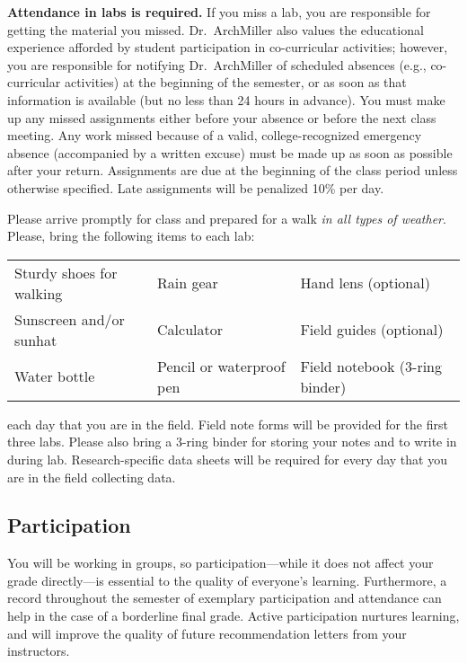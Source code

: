 \documentclass{tufte-handout}
\begin{document}
\begin{fullwidth}
\textbf{Attendance in labs is required.} If you miss a lab, you are responsible for getting the material you missed. Dr.~ArchMiller also values the educational experience afforded by student participation in co-curricular activities; however, you are responsible for notifying Dr.~ArchMiller of scheduled absences (e.g., co-curricular activities) at the beginning of the semester, or as soon as that information is available (but no less than 24 hours in advance). You must make up any missed assignments either before your absence or before the next class meeting. Any work missed because of a valid, college-recognized emergency absence (accompanied by a written excuse) must be made up as soon as possible after your return. Assignments are due at the beginning of the class period unless otherwise specified. Late assignments will be penalized 10\% per day.

 Please arrive promptly for class and prepared for a walk \emph{in all types of weather}. Please, bring the following items to each lab:

\begin{tabular}{lll}
Sturdy shoes for walking & Rain gear & Hand lens (optional)\\
Sunscreen and/or sunhat & Calculator & Field guides (optional)\\
Water bottle & Pencil or waterproof pen & Field notebook (3-ring binder)
\end{tabular}


 each day that you are in the field. Field note forms will be provided for the first three labs. Please also bring a 3-ring binder for storing your notes and to write in during lab. Research-specific data sheets will be required for every day that you are in the field collecting data. 

\subsection{Participation}

You will be working in groups, so participation---while it does not affect your grade directly---is essential to the quality of everyone's learning. Furthermore, a record throughout the semester of exemplary participation and attendance can help in the case of a borderline final grade. Active participation nurtures learning, and will improve the quality of future recommendation letters from your instructors.  


\end{fullwidth}
\end{document}
